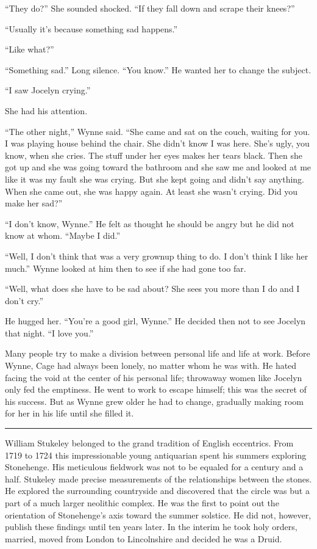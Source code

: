 ``They do?'' She sounded shocked. ``If they fall down and scrape their knees?''

``Usually it's because something sad happens.''

``Like what?''

``Something sad.'' Long silence. ``You know.'' He wanted her to change the subject.

``I saw Jocelyn crying.''

She had his attention.

``The other night,'' Wynne said. ``She came and sat on the couch, waiting for you. I was playing house behind the chair. She didn't know I was here. She's ugly, you know, when she cries. The stuff under her eyes makes her tears black. Then she got up and she was going toward the bathroom and she saw me and looked at me like it was my fault she was crying. But she kept going and didn't say anything. When she came out, she was happy again. At least she wasn't crying. Did you make her sad?''

``I don't know, Wynne.'' He felt as thought he should be angry but he did not know at whom. ``Maybe I did.''

``Well, I don't think that was a very grownup thing to do. I don't think I like her much.'' Wynne looked at him then to see if she had gone too far.

``Well, what does she have to be sad about? She sees you more than I do and I don't cry.''

He hugged her. ``You're a good girl, Wynne.'' He decided then not to see Jocelyn that night. ``I love you.''

Many people try to make a division between personal life and life at work. Before Wynne, Cage had always been lonely, no matter whom he was with. He hated facing the void at the center of his personal life; throwaway women like Jocelyn only fed the emptiness. He went to work to escape himself; this was the secret of his success. But as Wynne grew older he had to change, gradually making room for her in his life until she filled it.

\fancybreak{* * *}

William Stukeley belonged to the grand tradition of English eccentrics. From 1719 to 1724 this impressionable young antiquarian spent his summers exploring Stonehenge. His meticulous fieldwork was not to be equaled for a century and a half. Stukeley made precise measurements of the relationships between the stones. He explored the surrounding countryside and discovered that the circle was but a part of a much larger neolithic complex. He was the first to point out the orientation of Stonehenge's axis toward the summer solstice. He did not, however, publish these findings until ten years later. In the interim he took holy orders, married, moved from London to Lincolnshire and decided he was a Druid.

